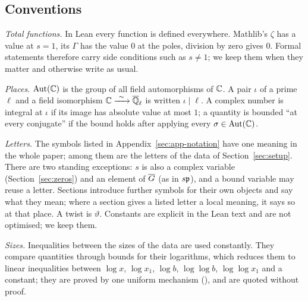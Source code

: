 \subsection{Conventions}

\emph{Total functions.} In Lean every function is defined everywhere. Mathlib's $\zeta$ has a
value at $s = 1$, its $\Gamma$ has the value $0$ at the poles, division by zero gives $0$. Formal
statements therefore carry side conditions such as $s \ne 1$; we keep them when they matter and
otherwise write as usual.

\emph{Places.} $\operatorname{Aut}(\mathbb{C})$ is the group of all field automorphisms of $\mathbb{C}$. A pair $\iota$ of a
prime $\ell$ and a field isomorphism $\mathbb{C} \xrightarrow{\ \sim\ } \overline{\mathbb{Q}}_\ell$ is written $\iota \mid \ell$. A complex
number is integral at $\iota$ if its image has absolute value at most $1$; a quantity is bounded
``at every conjugate'' if the bound holds after applying every $\sigma \in \operatorname{Aut}(\mathbb{C})$.

\emph{Letters.} The symbols listed in Appendix~\ref{sec:app-notation} have one meaning in the
whole paper; among them are the letters of the data of Section~\ref{sec:setup}. There are two
standing exceptions: $s$ is also a complex variable (Section~\ref{sec:zeros}) and an element of
$\overline{G}$ (as in $s\mathfrak{p}$), and a bound variable may reuse a letter. Sections introduce further
symbols for their own objects and say what they mean; where a section gives a listed letter a
local meaning, it says so at that place. A twist is $\vartheta$. Constants are explicit in the
Lean text and are not optimised; we keep them.

\emph{Sizes.} Inequalities between the sizes of the data are used constantly. They compare
quantities through bounds for their logarithms, which reduces them to linear inequalities between
$\log x$, $\log x_1$, $\log b$, $\log\log b$, $\log\log x_1$ and a constant; they are proved by one
uniform mechanism (), and are quoted without proof.
